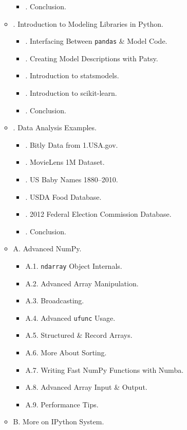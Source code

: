 \documentclass{article}
\begin{document}
\begin{enumerate}
\begin{itemize}
\begin{itemize}
			\item {. Conclusion.}
		\end{itemize}
		\item {. Introduction to Modeling Libraries in Python.}
		\begin{itemize}
			\item {. Interfacing Between {\tt pandas} \& Model Code.}
			\item {. Creating Model Descriptions with Patsy.}
			\item {. Introduction to statsmodels.}
			\item {. Introduction to scikit-learn.}
			\item {. Conclusion.}
		\end{itemize}
		\item {. Data Analysis Examples.}
		\begin{itemize}
			\item {. Bitly Data from 1.USA.gov.}
			\item {. MovieLens 1M Dataset.}
			\item {. US Baby Names 1880--2010.}
			\item {. USDA Food Database.}
			\item {. 2012 Federal Election Commission Database.}
			\item {. Conclusion.}
		\end{itemize}
		\item {\sf A. Advanced NumPy.}
		\begin{itemize}
			\item {\sf A.1. {\tt ndarray} Object Internals.}
			\item {\sf A.2. Advanced Array Manipulation.}
			\item {\sf A.3. Broadcasting.}
			\item {\sf A.4. Advanced {\tt ufunc} Usage.}
			\item {\sf A.5. Structured \& Record Arrays.}
			\item {\sf A.6. More About Sorting.}
			\item {\sf A.7. Writing Fast NumPy Functions with Numba.}
			\item {\sf A.8. Advanced Array Input \& Output.}
			\item {\sf A.9. Performance Tips.}
		\end{itemize}
		\item {\sf B. More on IPython System.}
		\begin{itemize}

\end{itemize}
\end{itemize}
\end{enumerate}
\end{document}
